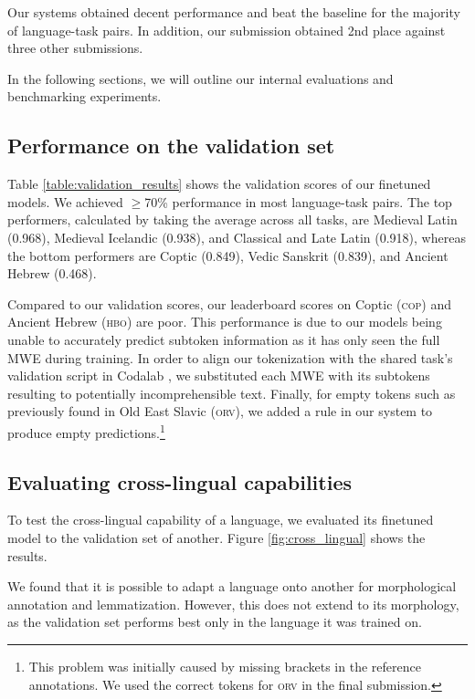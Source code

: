 \documentclass[11pt]{article}
\begin{document}
Our systems obtained decent performance and beat the baseline for the majority of language-task pairs.
In addition, our submission obtained 2nd place against three other submissions.

In the following sections, we will outline our internal evaluations and benchmarking experiments.

\subsection{Performance on the validation set}



Table \ref{table:validation_results} shows the validation scores of our finetuned models.
We achieved $\geq$70\% performance in most language-task pairs.
The top performers, calculated by taking the average across all tasks, are Medieval Latin (0.968), Medieval Icelandic (0.938), and Classical and Late Latin (0.918),
whereas the bottom performers are Coptic (0.849), Vedic Sanskrit (0.839), and Ancient Hebrew (0.468).

Compared to our validation scores, our leaderboard scores on Coptic (\textsc{cop}) and Ancient Hebrew (\textsc{hbo}) are poor.
This performance is due to our models being unable to accurately predict subtoken information as it has only seen the full MWE during training.
In order to align our tokenization with the shared task's validation script in Codalab \cite{pavao-etal-2023-codalab}, we substituted each MWE with its subtokens resulting to potentially incomprehensible text.
Finally, for empty tokens such as previously found in Old East Slavic (\textsc{orv}), we added a rule in our system to produce empty predictions.\footnote[1]{This problem was initially caused by missing brackets in the reference annotations. We used the correct tokens for \textsc{orv} in the final submission.}

\subsection{Evaluating cross-lingual capabilities}
\label{sec:results_crosslingual}

To test the cross-lingual capability of a language, we evaluated its finetuned model to the validation set of another.
Figure \ref{fig:cross_lingual} shows the results.

We found that it is possible to adapt a language onto another for morphological annotation and lemmatization.
However, this does not extend to its morphology, as the validation set performs best only in the language it was trained on.
\end{document}
